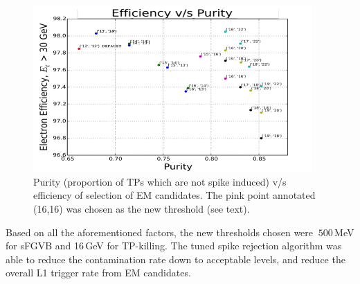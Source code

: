\begin{figure}
  \begin{center}
  \captionsetup{width=0.94\textwidth,justification=centering}
  \includegraphics[width=0.95\textwidth,keepaspectratio]{plots_and_figures/chapter3/spikeroc.png}
\caption{Purity (proportion of TPs which are not spike induced) v/s efficiency of selection of EM candidates. The pink point annotated (16,16) was chosen as the new threshold (see text).}
\label{fig:spikeroc}
\end{center}
\end{figure}

Based on all the aforementioned factors, the new thresholds chosen were $~500\,$MeV for sFGVB and 16\,GeV for TP-killing. The tuned spike rejection algorithm was able to reduce the contamination rate down to acceptable levels, and reduce the overall L1 trigger rate from EM candidates.  



